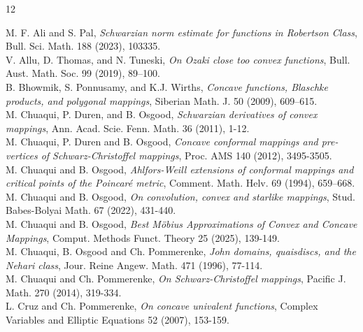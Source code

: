 \documentclass[reqno]{amsart}
\theoremstyle{plain}
\theoremstyle{definition}
\begin{document}
\begin{thebibliography}{12}

M. F. Ali and S. Pal, \emph{ Schwarzian norm estimate for functions in Robertson Class}, Bull. Sci. Math. 188 (2023), 103335.\\

V. Allu, D. Thomas, and N. Tuneski, \emph{On Ozaki close too convex functions}, Bull. Aust. Math. Soc. 99 (2019), 89–100.\\

B. Bhowmik, S. Ponnusamy, and K.J. Wirths, \emph{Concave functions, Blaschke products, and polygonal mappings}, Siberian Math. J. 50 (2009), 609–615.\\

M. Chuaqui, P. Duren, and B. Osgood, \emph{Schwarzian derivatives of convex mappings}, Ann. Acad. Scie. Fenn. Math. 36 (2011), 1-12.\\

M. Chuaqui, P. Duren and B. Osgood, \emph{Concave conformal mappings and pre-vertices of Schwarz-Christoffel mappings}, Proc. AMS 140 (2012), 3495-3505.\\

M. Chuaqui and B. Osgood, \emph{Ahlfors-Weill extensions of conformal mappings and critical points of the Poincaré metric}, Comment. Math. Helv. 69 (1994), 659–668.\\

M. Chuaqui and B. Osgood, \emph{On convolution, convex and starlike mappings}, Stud. Babes-Bolyai Math. 67 (2022), 431-440.\\

M. Chuaqui and B. Osgood, \emph{Best Möbius Approximations of Convex and Concave Mappings}, Comput. Methods Funct. Theory 25 (2025), 139-149.\\


 M. Chuaqui, B. Osgood and Ch. Pommerenke,  \emph{John domains, quaisdiscs, and the Nehari class}, Jour. Reine Angew. Math. 471 (1996), 77-114.\\

M. Chuaqui and Ch. Pommerenke, \emph{On Schwarz-Christoffel mappings}, Pacific J. Math. 270 (2014), 319-334.\\

L. Cruz and Ch. Pommerenke, \emph{On concave univalent functions}, Complex Variables and Elliptic Equations 52 (2007), 153-159.\\


\end{thebibliography}
\end{document}
